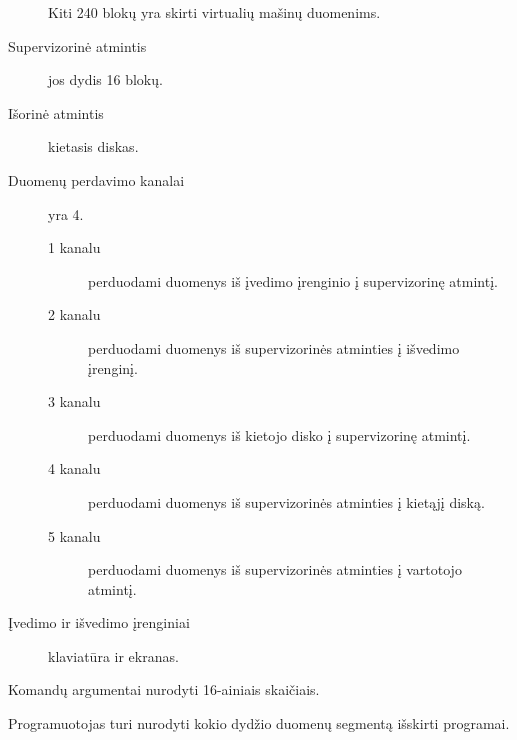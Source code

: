 \begin{description}
    Kiti 240 blokų yra skirti virtualių mašinų duomenims.
  \item[Supervizorinė atmintis] jos dydis 16 blokų.
  \item[Išorinė atmintis] kietasis diskas.
  \item[Duomenų perdavimo kanalai] yra 4. 
    \begin{description}
      \item[1 kanalu] perduodami duomenys iš įvedimo įrenginio į 
        supervizorinę atmintį.
      \item[2 kanalu] perduodami duomenys iš supervizorinės atminties
        į išvedimo įrenginį.
      \item[3 kanalu] perduodami duomenys iš kietojo disko į supervizorinę
        atmintį.
      \item[4 kanalu] perduodami duomenys iš supervizorinės atminties į 
        kietąjį diską.
      \item[5 kanalu] perduodami duomenys iš supervizorinės atminties į 
        vartotojo atmintį.
    \end{description}
  \item[Įvedimo ir išvedimo įrenginiai] klaviatūra ir ekranas.
\end{description}

Komandų argumentai nurodyti 16-ainiais skaičiais.

Programuotojas turi nurodyti kokio dydžio duomenų segmentą 
išskirti programai.

